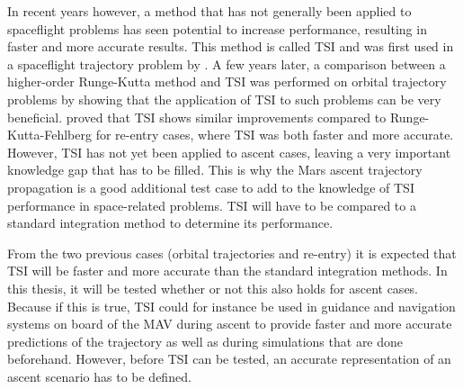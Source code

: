 In recent years however, a method that has not generally been applied to spaceflight problems has seen potential to increase performance, resulting in faster and more accurate results. This method is called \acf{TSI} and was first used in a spaceflight trajectory problem by \cite{montenbruck1992numerical}. A few years later, a comparison between a higher-order Runge-Kutta method and \ac{TSI} was performed on orbital trajectory problems by \cite{scott2008high} showing that the application of \ac{TSI} to such problems can be very beneficial. \cite{bergsma2016application} proved that \ac{TSI} shows similar improvements compared to Runge-Kutta-Fehlberg for re-entry cases, where \ac{TSI} was both faster and more accurate. However, \ac{TSI} has not yet been applied to ascent cases, leaving a very important knowledge gap that has to be filled. This is why the Mars ascent trajectory propagation is a good additional test case to add to the knowledge of \ac{TSI} performance in space-related problems. \ac{TSI} will have to be compared to a standard integration method to determine its performance. 

From the two previous cases (orbital trajectories and re-entry) it is expected that \ac{TSI} will be faster and more accurate than the standard integration methods. In this thesis, it will be tested whether or not this also holds for ascent cases. Because if this is true, \ac{TSI} could for instance be used in guidance and navigation systems on board of the \ac{MAV} during ascent to provide faster and more accurate predictions of the trajectory as well as during simulations that are done beforehand. However, before \ac{TSI} can be tested, an accurate representation of an ascent scenario has to be defined. 
 


